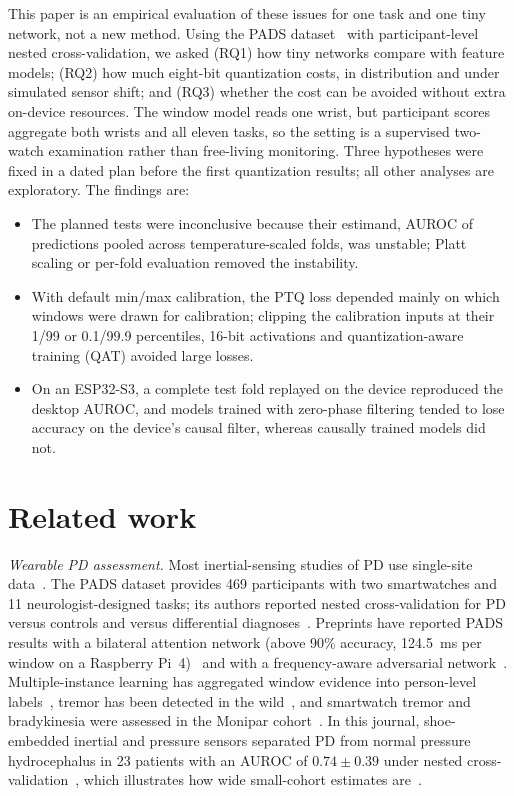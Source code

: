 \documentclass[preprint,12pt]{elsarticle}
\begin{document}
This paper is an empirical evaluation of these issues for one task and one tiny network, not a new method. Using the PADS dataset~\cite{Varghese2024} with participant-level nested cross-validation, we asked (RQ1) how tiny networks compare with feature models; (RQ2) how much eight-bit quantization costs, in distribution and under simulated sensor shift; and (RQ3) whether the cost can be avoided without extra on-device resources. The window model reads one wrist, but participant scores aggregate both wrists and all eleven tasks, so the setting is a supervised two-watch examination rather than free-living monitoring. Three hypotheses were fixed in a dated plan before the first quantization results; all other analyses are exploratory. The findings are:
\begin{itemize}
  \item The planned tests were inconclusive because their estimand, AUROC of predictions pooled across temperature-scaled folds, was unstable; Platt scaling or per-fold evaluation removed the instability.
  \item With default min/max calibration, the PTQ loss depended mainly on which windows were drawn for calibration; clipping the calibration inputs at their 1/99 or 0.1/99.9 percentiles, 16-bit activations and quantization-aware training (QAT) avoided large losses.
  \item On an ESP32-S3, a complete test fold replayed on the device reproduced the desktop AUROC, and models trained with zero-phase filtering tended to lose accuracy on the device's causal filter, whereas causally trained models did not.
\end{itemize}

\section{Related work}
\label{sec:related}
\emph{Wearable PD assessment.} Most inertial-sensing studies of PD use single-site data~\cite{Rovini2017,Sigcha2023rev}. The PADS dataset provides 469 participants with two smartwatches and 11 neurologist-designed tasks; its authors reported nested cross-validation for PD versus controls and versus differential diagnoses~\cite{Varghese2024}. Preprints have reported PADS results with a bilateral attention network (above 90\% accuracy, 124.5~ms per window on a Raspberry Pi~4)~\cite{Zannat2026} and with a frequency-aware adversarial network~\cite{Zhao2025MFAM}. Multiple-instance learning has aggregated window evidence into person-level labels~\cite{Papadopoulos2023,Ilse2018}, tremor has been detected in the wild~\cite{SanSegundo2020}, and smartwatch tremor and bradykinesia were assessed in the Monipar cohort~\cite{Sigcha2021,Monipar2023}. In this journal, shoe-embedded inertial and pressure sensors separated PD from normal pressure hydrocephalus in 23 patients with an AUROC of $0.74 \pm 0.39$ under nested cross-validation~\cite{Magni2026}, which illustrates how wide small-cohort estimates are~\cite{Varoquaux2018}.
\end{document}
